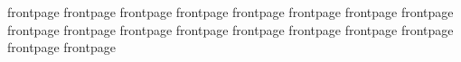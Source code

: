 f r o n t p a g e   
 
 f r o n t p a g e   
 
 f r o n t p a g e   
 
 f r o n t p a g e   
 
 f r o n t p a g e   
 
 f r o n t p a g e   
 
 f r o n t p a g e   
 
 f r o n t p a g e   
 
 f r o n t p a g e   
 f r o n t p a g e   
 
 f r o n t p a g e   
 
 f r o n t p a g e   
 
 f r o n t p a g e   
 
 f r o n t p a g e   
 
 f r o n t p a g e   
 f r o n t p a g e   
 
 f r o n t p a g e   
 
 f r o n t p a g e   
 
 